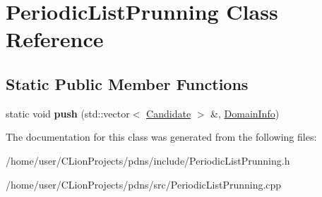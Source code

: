 \hypertarget{classPeriodicListPrunning}{}\section{Periodic\+List\+Prunning Class Reference}
\label{classPeriodicListPrunning}
\subsection*{Static Public Member Functions}
\begin{DoxyCompactItemize}
\item 
\mbox{\label{classPeriodicListPrunning_a185475fec9a559740d30ae9129fe04f5}} 
static void {\bfseries push} (std\+::vector$<$ \hyperlink{structCandidate}{Candidate} $>$ \&, \hyperlink{structDomainInfo}{Domain\+Info})
\end{DoxyCompactItemize}


The documentation for this class was generated from the following files\+:\begin{DoxyCompactItemize}
\item 
/home/user/\+C\+Lion\+Projects/pdns/include/Periodic\+List\+Prunning.\+h\item 
/home/user/\+C\+Lion\+Projects/pdns/src/Periodic\+List\+Prunning.\+cpp\end{DoxyCompactItemize}
